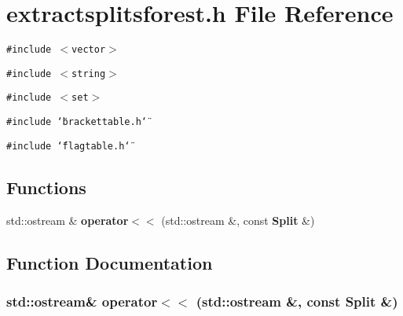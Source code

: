 \section{extractsplitsforest.h File Reference}
\label{extractsplitsforest_8h}
{\tt \#include $<$vector$>$}\par
{\tt \#include $<$string$>$}\par
{\tt \#include $<$set$>$}\par
{\tt \#include \char`\"{}brackettable.h\char`\"{}}\par
{\tt \#include \char`\"{}flagtable.h\char`\"{}}\par
\subsection*{Functions}
\begin{CompactItemize}
\item 
std::ostream \& {\bf operator$<$$<$} (std::ostream \&, const {\bf Split} \&)
\end{CompactItemize}


\subsection{Function Documentation}
\subsubsection{\setlength{\rightskip}{0pt plus 5cm}std::ostream\& operator$<$$<$ (std::ostream \&, const {\bf Split} \&)}\label{extractsplitsforest_8h_a0}


